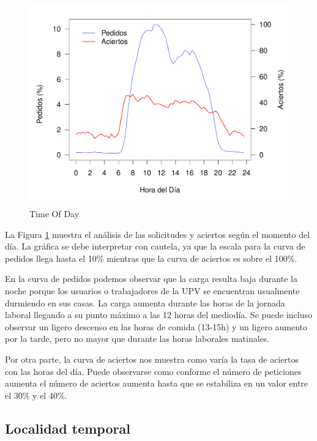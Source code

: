 \documentclass[twocolumn]{Jornadas}
\begin{document}
\begin{figure}[]
\begin{center}
  \includegraphics[scale=0.30]{figures/TimeOfDay3_full.pdf}
\end{center}
\caption{Time Of Day} \label{Timeday}
\end{figure}

La Figura \ref{Timeday} muestra el análisis de las solicitudes y aciertos según el momento del día. La gráfica se debe interpretar con cautela, ya que la escala para la curva de pedidos llega hasta el 10\% mientras que la curva de aciertos es sobre el 100\%. 

En la curva de pedidos podemos observar que la carga resulta baja durante la noche porque los usuarios o trabajadores de la UPV se encuentran usualmente durmiendo en sus casas. La carga aumenta durante las horas de la jornada laboral llegando a su punto máximo a las 12 horas del mediodía. Se puede incluso observar un ligero descenso en las horas de comida (13-15h) y un ligero aumento por la tarde, pero no mayor que durante las horas laborales matinales.

Por otra parte, la curva de aciertos nos muestra como varía la tasa de aciertos con las horas del día. Puede observarse como conforme el número de peticiones aumenta el número de aciertos aumenta hasta que se estabiliza en un valor entre el 30\% y el 40\%.

\subsection{Localidad temporal}
\end{document}
